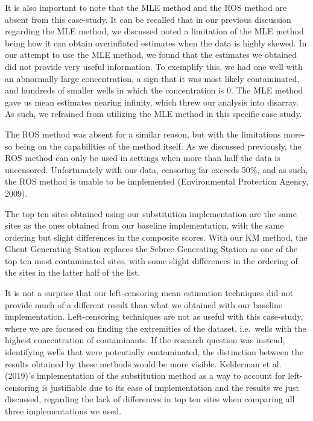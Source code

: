 \documentclass[12pt, twoside]{amherstthesis}
\begin{document}
It is also important to note that the MLE method and the ROS method are absent from this case-study. It can be recalled that in our previous discussion regarding the MLE method, we discussed noted a limitation of the MLE method being how it can obtain overinflated estimates when the data is highly skewed. In our attempt to use the MLE method, we found that the estimates we obtained did not provide very useful information. To exemplify this, we had one well with an abnormally large concentration, a sign that it was most likely contaminated, and hundreds of smaller wells in which the concentration is 0. The MLE method gave us mean estimates nearing infinity, which threw our analysis into disarray. As such, we refrained from utilizing the MLE method in this specific case study.

The ROS method was absent for a similar reason, but with the limitations more-so being on the capabilities of the method itself. As we discussed previously, the ROS method can only be used in settings when more than half the data is uncensored. Unfortunately with our data, censoring far exceeds 50\%, and as such, the ROS method is unable to be implemented (Environmental Protection Agency, 2009).

The top ten sites obtained using our substitution implementation are the same sites as the ones obtained from our baseline implementation, with the same ordering but slight differences in the composite scores. With our KM method, the Ghent Generating Station replaces the Sebree Generating Station as one of the top ten most contaminated sites, with some slight differences in the ordering of the sites in the latter half of the list.

It is not a surprise that our left-censoring mean estimation techniques did not provide much of a different result than what we obtained with our baseline implementation. Left-censoring techniques are not as useful with this case-study, where we are focused on finding the extremities of the dataset, i.e.~wells with the highest concentration of contaminants. If the research question was instead, identifying wells that were potentially contaminated, the distinction between the results obtained by these methods would be more visible. Kelderman et al. (2019)'s implementation of the substitution method as a way to account for left-censoring is justifiable due to its ease of implementation and the results we just discussed, regarding the lack of differences in top ten sites when comparing all three implementations we used.
\end{document}
